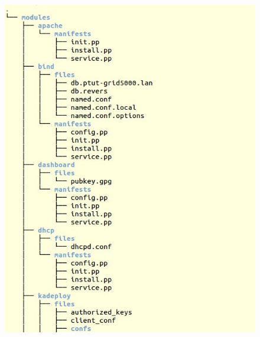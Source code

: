 \documentclass[a4paper,10pt]{article}
\begin{document}
		\begin{figure}[!h]
			\centering			
			\includegraphics[scale=0.365]{Tree1.jpg}	

\end{figure}
\end{document}
